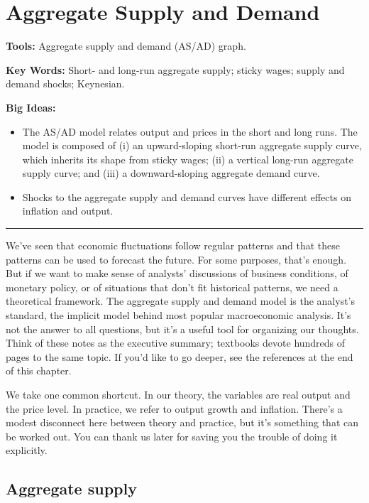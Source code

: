 \chapter{Aggregate Supply and Demand}\label{chp:asad}
\hypertarget{asad}{}

\textbf{Tools:} Aggregate supply and demand (AS/AD) graph.

\textbf{Key Words:} Short- and long-run aggregate supply; sticky wages;
supply and demand shocks; Keynesian.

\textbf{Big Ideas:}
\vspace{-0.1in}
\begin{itemize}
\item The AS/AD model relates output and prices in the short and long runs.
The model is composed of (i) an upward-sloping short-run aggregate supply curve,
which inherits its shape from sticky wages;
(ii) a vertical long-run aggregate supply curve;
and (iii) a downward-sloping aggregate demand curve.
\item Shocks to the aggregate supply and demand curves
have different effects on inflation and output.
\end{itemize}
\rule{\textwidth}{1pt}

We've seen that economic fluctuations follow regular patterns
and that these patterns can be used to forecast the future.
For some purposes, that's enough.
But if we want to make sense of analysts' discussions of business conditions,
of monetary policy,
or of situations that don't fit historical patterns,
we need a theoretical framework.
The aggregate supply and demand model is the analyst's standard,
the implicit model behind most popular macroeconomic analysis.
It's not the answer to all questions,
but it's a useful tool for organizing our thoughts.
Think of these notes as the executive summary;
textbooks devote hundreds of pages to the same topic.
If you'd like to go deeper, see the references at the end of this chapter.

We take one common shortcut.
In our theory, the variables are real output and the price level.
In practice, we refer to output growth and inflation.
There's a modest disconnect here between theory and practice,
but it's something that can be worked out.
You can thank us later for saving you the trouble of
doing it explicitly.


\section{Aggregate supply}


